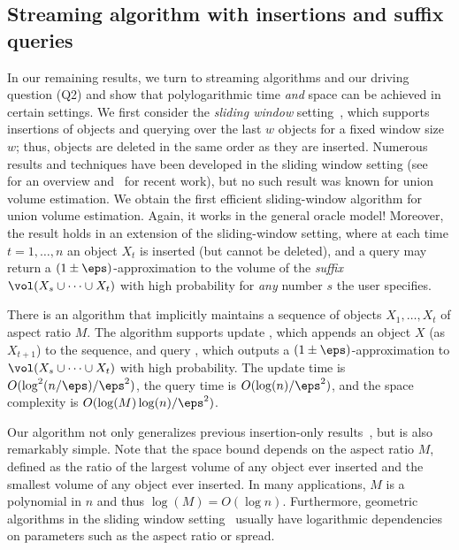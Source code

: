 \subsection{Streaming algorithm with insertions and suffix queries}
%
In our remaining results, we turn to streaming algorithms and our driving question (Q2) and show that polylogarithmic time \emph{and} space can be achieved in certain settings. 
We first consider the \emph{sliding window} setting~\cite{datar2002maintaining}, which supports insertions of objects and querying over the last $w$ objects for a fixed window size $w$;
thus, objects are deleted in the same order as they are inserted. Numerous results and techniques have been developed in the sliding window setting (see~\cite{muthukrishnan2005data,babcock2002models,Braverman16} for an overview and~\cite{woodruff2022tight,JayaramWZ22,FengSW25} for recent work), but no such result was known for union volume estimation.
%
We obtain the first efficient sliding-window algorithm for union volume estimation. Again, it
works in the general oracle model! Moreover, the result holds in an extension of the sliding-window setting, where at each time $t = 1, \dots, n$ an object $X_t$ is inserted (but cannot be deleted), and a query  may return a $(1\pm\eps)$-approximation to the volume of the \emph{suffix} $\vol(X_s \cup \cdots \cup X_t)$ with high probability for \emph{any} number $s$ the user specifies. 
%
\begin{theorem}
\label{thm:windowalgo}%
There is an algorithm that implicitly maintains a sequence of objects $X_1, \dots, X_t$ of aspect ratio $M$. The algorithm supports update , which appends an object $X$ (as $X_{t+1}$) to the sequence, and query , which outputs a $(1\pm\eps)$-approximation to $\vol(X_s \cup \cdots \cup X_t)$ with high probability. The update time is $O(\log^2(n/\eps)/\eps^2)$, the query time is $O(\log(n)/\eps^2)$, and the space complexity is $O(\log(M) \log(n)/\eps^2)$.
\end{theorem}
%
Our algorithm not only generalizes previous insertion-only results~\cite{MVC21}, but is also remarkably simple. Note that the space bound depends on the aspect ratio $M$, defined as the ratio of the largest volume of any object ever inserted and the smallest volume of any object ever inserted. In many applications, $M$ is a polynomial in $n$ and thus $\log(M) = O(\log n)$. Furthermore, geometric algorithms in the sliding window setting~\cite{FeigenbaumKZ04,ChanS06} usually have logarithmic dependencies on parameters such as the aspect ratio or spread.
%
